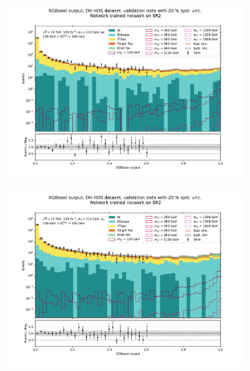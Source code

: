 \documentclass[12pt, a4paper]{book}
\begin{document}
\begin{figure}[!ht]
	\centering
	\begin{subfigure}[b]{0.49\textwidth}
      \centering
      \includegraphics[width=1\textwidth]{XGBoost/Model_independent/100-150/DH_HDS/VAL_ee.pdf}
   \end{subfigure}
   \hfill
   \begin{subfigure}[b]{0.49\textwidth}
      \centering
      \includegraphics[width=1\textwidth]{XGBoost/Model_independent/100-150/DH_HDS/VAL_uu.pdf}
   \end{subfigure}
   \hfill
   \begin{subfigure}[b]{0.49\textwidth}
      \centering

\end{subfigure}
\end{figure}
\end{document}
